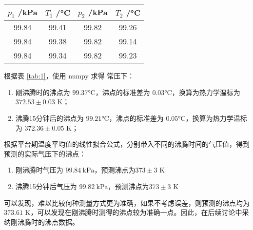 \begin{table}[htbp]
    \centering
    \begin{tabular}{cc|cc}
    \toprule
    \( p_1 \) /\si{kPa} & \( T_1 \) /\si{\celsius} & \( p_2 \) /\si{kPa} & \( T_2 \) /\si{\celsius}\\
    \midrule
    99.84 & 99.41 & 99.82 & 99.26\\
    99.84 & 99.38 & 99.82 & 99.14\\
    99.84 & 99.34 & 99.82 & 99.23\\
    \bottomrule
    \end{tabular}
    \label{tab:6}
\end{table}

根据表 \ref{tab:1}，使用 numpy 求得  常压下：
\begin{enumerate}
    \item 刚沸腾时的沸点为 \( 99.37 \)\si{\celsius}，沸点的标准差为 \( 0.03 \)\si{\celsius}，换算为热力学温标为 \(372.53\pm 0.03\) K；
    \item 沸腾15分钟后的沸点为 \( 99.21 \)\si{\celsius}，沸点的标准差为 \( 0.05 \)\si{\celsius}，换算为热力学温标为 \(372.36\pm 0.05\) K；
\end{enumerate}

根据平台期温度平均值的线性拟合公式，分别带入不同的沸腾时间的气压值，得到预测的实际气压下的沸点：
\begin{enumerate}
    \item 刚沸腾时气压为 $99.84\mathrm{~kPa}$，预测沸点为\(373\pm 3\) K
    \item 沸腾15分钟后气压为 $99.82\mathrm{~kPa}$，预测沸点为\(373\pm 3\) K
\end{enumerate}
可以发现，难以比较何种测量方式更为准确，如果不考虑误差，则预测的沸点均为 \(373.61\) K，可以发现在刚沸腾时测得的沸点较为准确一点。因此，在后续讨论中采纳刚沸腾时的沸点数据。














































